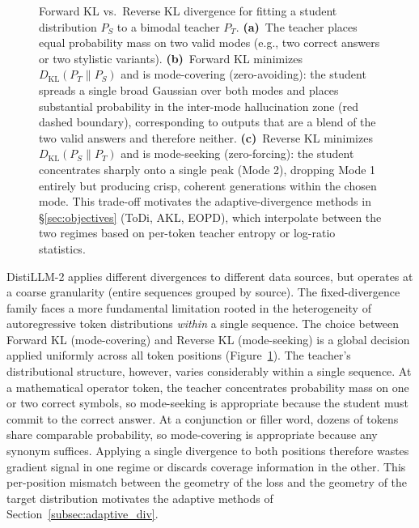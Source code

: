 \documentclass{article} %
\newcommand{\KL}{D_{\mathrm{KL}}}
\begin{document}
\begin{figure}[t]
{\begin{tikzpicture}[>=Stealth]
\end{tikzpicture}
}
\caption{Forward KL vs.\ Reverse KL divergence for fitting a student distribution $P_S$ to a bimodal teacher $P_T$. \textbf{(a)}~The teacher places equal probability mass on two valid modes (e.g., two correct answers or two stylistic variants). \textbf{(b)}~Forward KL minimizes $\KL(P_T \parallel P_S)$ and is mode-covering (zero-avoiding): the student spreads a single broad Gaussian over both modes and places substantial probability in the inter-mode hallucination zone (red dashed boundary), corresponding to outputs that are a blend of the two valid answers and therefore neither. \textbf{(c)}~Reverse KL minimizes $\KL(P_S \parallel P_T)$ and is mode-seeking (zero-forcing): the student concentrates sharply onto a single peak (Mode 2), dropping Mode 1 entirely but producing crisp, coherent generations within the chosen mode. This trade-off motivates the adaptive-divergence methods in \S\ref{sec:objectives} (ToDi, AKL, EOPD), which interpolate between the two regimes based on per-token teacher entropy or log-ratio statistics.}
\label{fig:kl_divergence}
\end{figure}

DistiLLM-2 applies different divergences to different data sources, but operates at a coarse granularity (entire sequences grouped by source). The fixed-divergence family faces a more fundamental limitation rooted in the heterogeneity of autoregressive token distributions \emph{within} a single sequence. The choice between Forward KL (mode-covering) and Reverse KL (mode-seeking) is a global decision applied uniformly across all token positions (Figure~\ref{fig:kl_divergence}). The teacher's distributional structure, however, varies considerably within a single sequence. At a mathematical operator token, the teacher concentrates probability mass on one or two correct symbols, so mode-seeking is appropriate because the student must commit to the correct answer. At a conjunction or filler word, dozens of tokens share comparable probability, so mode-covering is appropriate because any synonym suffices. Applying a single divergence to both positions therefore wastes gradient signal in one regime or discards coverage information in the other. This per-position mismatch between the geometry of the loss and the geometry of the target distribution motivates the adaptive methods of Section~\ref{subsec:adaptive_div}.
\end{document}
